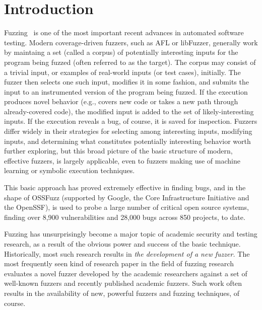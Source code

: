 





\section{Introduction}
\label{sec:intro}

Fuzzing~\cite{fuzzoverview} is one of the most important recent advances in 
automated software testing.  Modern coverage-driven fuzzers, such as AFL or 
libFuzzer, generally work by maintaing a set (called a corpus) of potentially interesting 
inputs for the program being fuzzed (often referred to as the target).  The corpus may consist of a 
trivial input, or examples of real-world inputs (or test cases), initially.  
The fuzzer then selects one such input, modifies it in some fashion, and 
submits the input to an instrumented version of the program being fuzzed.  If 
the execution produces novel behavior (e.g., covers new code or takes a new 
path through already-covered code), the modified input is added to the set of 
likely-interesting inputs.   If the execution reveals a bug, of course, it is 
saved for inspection.   Fuzzers differ widely in their strategies for selecting 
among interesting inputs, modifying inputs, and determining what constitutes 
potentially interesting behavior worth further exploring, but this broad picture of the basic 
structure of modern, effective fuzzers, is largely applicable, even to fuzzers 
making use of machine learning or symbolic execution techniques.

This basic approach has proved extremely effective in finding bugs, and in the 
shape of OSSFuzz (supported by Google, the Core Infrastructure Initiative and 
the OpenSSF), is used to probe a large number of critical open source systems, 
finding over 8,900 vulnerabilities and 28,000 bugs across 850 projects, to date.

Fuzzing has unsurprisingly become a major topic of academic security and 
testing research, as a result of the obvious power and success of the basic 
technique.  Historically, most such research results in \emph{the development of a 
new fuzzer.}  The most frequently seen kind of research paper in the field of fuzzing
research evaluates a
novel fuzzer developed by the academic researchers against a set of well-known 
fuzzers and recently published academic fuzzers.  Such work often results in 
the availability of new, powerful fuzzers and fuzzing techniques, of course.  

